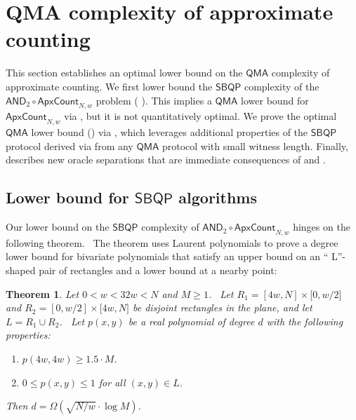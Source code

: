 \documentclass[10pt,a4paper]{article}
\newtheorem{theorem}{Theorem}
\newcommand{\<}{\langle}
\renewcommand{\>}{\rangle}
\newcommand{\cl}[1]{\mathsf{#1}}
\newcommand{\AndApxCount}{\mathsf{AND}_2\circ\mathsf{ApxCount}_{N,w}}
\begin{document}
%

\section{QMA complexity of approximate counting}

\label{sec:SBPQMA}

This section establishes
an 
optimal lower bound on the $\mathsf{QMA}$
complexity of approximate counting.
We first lower bound the $\mathsf{SBQP}$ complexity
of the $\mathsf{AND}_2 \circ \mathsf{ApxCount}_{N,w}$ problem (
). 
This implies a $\mathsf{QMA}$ lower bound
for $\mathsf{ApxCount}_{N,w}$ via ,
but it is not quantitatively optimal. 
We prove the optimal $\mathsf{QMA}$ lower bound 
() via
, which
leverages additional properties 
of 
the $\mathsf{SBQP}$ protocol derived via
from any $\mathsf{QMA}$ protocol with small
witness length. Finally, 
describes new oracle separations that
are immediate consequences of  and . 

%
\subsection{Lower bound for \texorpdfstring{$\mathsf{SBQP}$}{SBQP} algorithms}
\label{sec:SBQP} 

Our lower bound on the $\cl{SBQP}$ complexity of $\AndApxCount$ hinges 
on the following theorem. \ The theorem
uses Laurent polynomials to prove a degree lower bound for bivariate
polynomials that satisfy an upper bound on an \textquotedblleft
L\textquotedblright -shaped pair of rectangles and a lower bound at a nearby
point:

\begin{theorem}
\label{thm:L} Let $0<w<32w<N$ and $M\geq 1$. \ Let $R_{1}=[4w,N]\times \lbrack 0,w/2]$ and
$R_{2}=[0,w/2]\times \lbrack 4w,N]$ be disjoint rectangles in the plane, and
let $L=R_{1}\cup R_{2}$. \ Let $p(x,y)$ be a real polynomial of degree $d$
with the following properties:
\begin{enumerate}
\item $p(4w, 4w) \ge 1.5 \cdot M$.
\item $0 \le p(x, y) \le 1$ for all $(x, y) \in L$.
\end{enumerate}
Then $d = \Omega(\sqrt{N/w} \cdot \log M)$.
\end{theorem}
\end{document}
